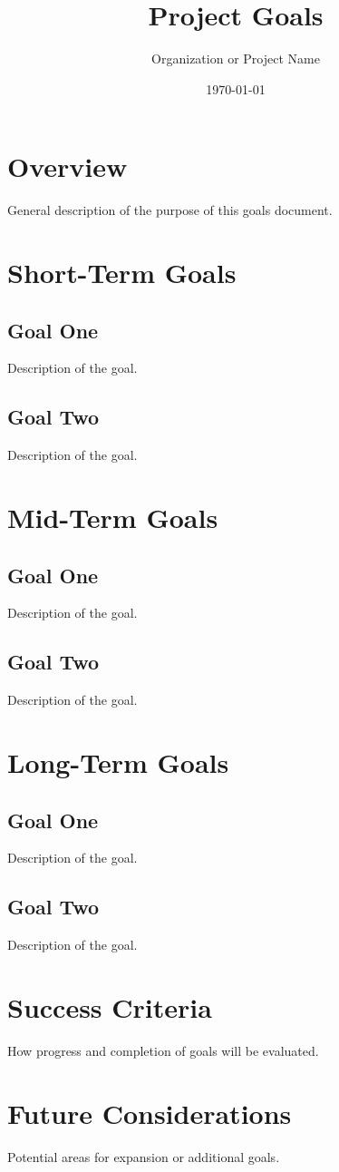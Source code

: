 \documentclass[11pt]{article}
\title{Project Goals}
\author{Organization or Project Name}
\date{\today}
\begin{document}
\maketitle
\thispagestyle{empty}

\newpage
\tableofcontents
\newpage

\section{Overview}

General description of the purpose of this goals document.

\section{Short-Term Goals}

\subsection{Goal One}

Description of the goal.

\subsection{Goal Two}

Description of the goal.

\section{Mid-Term Goals}

\subsection{Goal One}

Description of the goal.

\subsection{Goal Two}

Description of the goal.

\section{Long-Term Goals}

\subsection{Goal One}

Description of the goal.

\subsection{Goal Two}

Description of the goal.

\section{Success Criteria}

How progress and completion of goals will be evaluated.

\section{Future Considerations}

Potential areas for expansion or additional goals.
\end{document}
